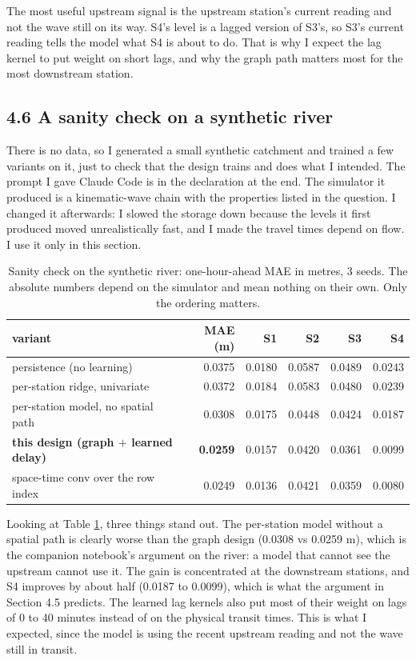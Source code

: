 \documentclass[11pt,letterpaper]{article}
\begin{document}
The most useful upstream signal is the upstream station's current reading and not
the wave still on its way. S4's level is a lagged version of S3's, so S3's current
reading tells the model what S4 is about to do. That is why I expect the lag
kernel to put weight on short lags, and why the graph path matters most for the
most downstream station.

\subsection*{4.6 A sanity check on a synthetic river}

There is no data, so I generated a small synthetic catchment and trained a few
variants on it, just to check that the design trains and does what I intended. The
prompt I gave Claude Code is in the declaration at the end. The simulator it
produced is a kinematic-wave chain with the properties listed in the question. I
changed it afterwards: I slowed the storage down because the levels it first
produced moved unrealistically fast, and I made the travel times depend on flow. I
use it only in this section.

\begin{table}[H]
\centering
\small
\begin{tabular}{@{}lrrrrr@{}}
\toprule
\textbf{variant} & \textbf{MAE (m)} & \textbf{S1} & \textbf{S2} & \textbf{S3} & \textbf{S4} \\
\midrule
persistence (no learning)      & 0.0375 & 0.0180 & 0.0587 & 0.0489 & 0.0243 \\
per-station ridge, univariate   & 0.0372 & 0.0184 & 0.0583 & 0.0480 & 0.0239 \\
per-station model, no spatial path & 0.0308 & 0.0175 & 0.0448 & 0.0424 & 0.0187 \\
\textbf{this design (graph $+$ learned delay)} & \textbf{0.0259} & 0.0157 & 0.0420 & 0.0361 & 0.0099 \\
space-time conv over the row index & 0.0249 & 0.0136 & 0.0421 & 0.0359 & 0.0080 \\
\bottomrule
\end{tabular}
\caption{Sanity check on the synthetic river: one-hour-ahead MAE in metres, 3 seeds. The
absolute numbers depend on the simulator and mean nothing on their own. Only the ordering matters.}
\label{tab:sanity}
\end{table}

Looking at Table \ref{tab:sanity}, three things stand out. The per-station model
without a spatial path is clearly worse than the graph design (0.0308 vs 0.0259 m),
which is the companion notebook's argument on the river: a model that cannot see
the upstream cannot use it. The gain is concentrated at the downstream stations,
and S4 improves by about half (0.0187 to 0.0099), which is what the argument in
Section 4.5 predicts. The learned lag kernels also put most of their weight on lags
of 0 to 40 minutes instead of on the physical transit times. This is what I
expected, since the model is using the recent upstream reading and not the wave
still in transit.
\end{document}
